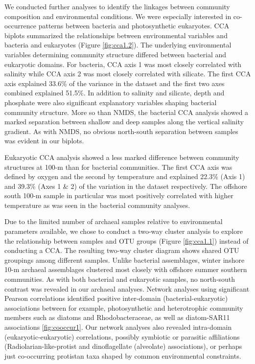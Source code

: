 We conducted further analyses to identify the linkages between community composition and environmental conditions. We were especially interested in co-occurrence patterns between bacteria and photosynthetic eukaryotes. CCA biplots summarized the relationships between environmental variables and bacteria and eukaryotes (Figure \ref{fig:cca1.2}). The underlying environmental variables determining community structure differed between bacterial and eukaryotic domains. For bacteria, CCA axis 1 was most closely correlated with salinity while CCA axis 2 was most closely correlated with silicate. The first CCA axis explained 33.6\% of the variance in the dataset and the first two axes combined explained 51.5\%. In addition to salinity and silicate, depth and phosphate were also significant explanatory variables shaping bacterial community structure. More so than NMDS, the bacterial CCA analysis showed a marked separation between shallow and deep samples along the vertical salinity gradient. As with NMDS, no obvious north-south separation between samples was evident in our biplots.


Eukaryotic CCA analysis showed a less marked difference between community structures at 100-m than for bacterial communities. The first CCA axis was defined by oxygen and the second by temperature and explained 22.3\% (Axis 1) and 39.3\% (Axes 1 \& 2) of the variation in the dataset respectively. The offshore south 100-m sample in particular was most positively correlated with higher temperature as was seen in the bacterial community analyses.

Due to the limited number of archaeal samples relative to environmental parameters available, we chose to conduct a two-way cluster analysis to explore the relationship between samples and OTU groups (Figure \ref{fig:cca1.1}) instead of conducting a CCA. The resulting two-way cluster diagram shows shared OTU groupings among different samples. Unlike bacterial assemblages, winter inshore 10-m archaeal assemblages clustered most closely with offshore summer southern communities. As with both bacterial and eukaryotic samples, no north-south contrast was revealed in our archaeal analyses. Network analyses using significant Pearson correlations identified positive inter-domain (bacterial-eukaryotic) associations between for example, photosynthetic and heterotrophic community members such as diatoms and Rhodobacteraceae, as well as diatom-SAR11 associations \ref{fig:cooccur1}. Our network analyses also revealed intra-domain (eukaryotic-eukaryotic) correlations, possibly symbiotic or parasitic affiliations (Radiolarian-like-protist and dinoflagellate (alveolate) associations), or perhaps just co-occurring protistan taxa shaped by common environmental constraints.

